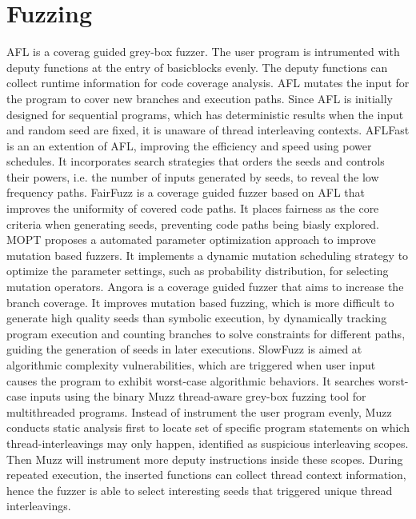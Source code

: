 \section{Fuzzing}

AFL\cite{afl} is a coverag guided grey-box fuzzer. The user program is intrumented with deputy functions at the entry of basicblocks evenly. The deputy functions can collect runtime information for code coverage analysis. AFL mutates the input for the program to cover new branches and execution paths. Since AFL is initially designed for sequential programs, which has deterministic results when the input and random seed are fixed, it is unaware of thread interleaving contexts.
AFLFast\cite{fuzz:aflfast} is an an extention of AFL, improving the efficiency and speed using power schedules. It incorporates search strategies that orders the seeds and controls their powers, i.e. the number of inputs generated by seeds, to reveal the low frequency paths.
FairFuzz\cite{fuzz:FairFuzz} is a coverage guided fuzzer based on AFL that improves the uniformity of covered code paths. It places fairness as the core criteria when generating seeds, preventing code paths being biasly explored.
MOPT\cite{fuzz:MOPT} proposes a automated parameter optimization approach to improve mutation based fuzzers. It implements a dynamic mutation scheduling strategy to optimize the parameter settings, such as probability distribution, for selecting mutation operators.
Angora\cite{fuzz:Angora} is a coverage guided fuzzer that aims to increase the branch coverage. It improves mutation based fuzzing, which is more difficult to generate high quality seeds than symbolic execution, by dynamically tracking program execution and counting branches to solve constraints for different paths, guiding the generation of seeds in later executions.
SlowFuzz\cite{fuzz:SlowFuzz} is aimed at algorithmic complexity vulnerabilities, which are triggered when user input causes the program to exhibit worst-case algorithmic behaviors. It searches worst-case inputs using the binary
Muzz\cite{muzz} thread-aware grey-box fuzzing tool for multithreaded programs. Instead of instrument the user program evenly, Muzz conducts static analysis first to locate set of specific program statements on which thread-interleavings may only happen, identified as suspicious interleaving scopes. Then Muzz will instrument more deputy instructions inside these scopes. During repeated execution, the inserted functions can collect thread context information, hence the fuzzer is able to select interesting seeds that triggered unique thread interleavings.

